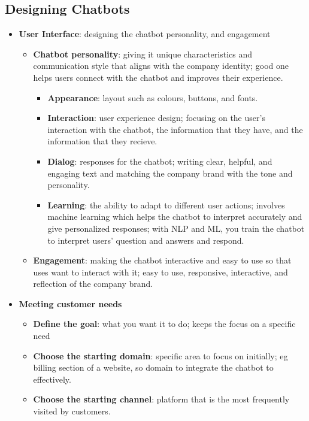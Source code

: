 \documentclass[12pt, letterpaper]{article}
\begin{document}
\subsection{Designing Chatbots}
\begin{itemize}
    \item \textbf{User Interface}: designing the chatbot personality, and engagement
        \begin{itemize}
            \item \textbf{Chatbot personality}: giving it unique characteristics and communication style that aligns with the company identity; good one helps users connect with the chatbot and improves their experience.
                \begin{itemize}
                    \item \textbf{Appearance}: layout such as colours, buttons, and fonts.
                    \item \textbf{Interaction}: user experience design; focusing on the user's interaction with the chatbot, the information that they have, and the information that they recieve.
                    \item \textbf{Dialog}: responses for the chatbot; writing clear, helpful, and engaging text and matching the company brand with the tone and personality.
                    \item \textbf{Learning}: the ability to adapt to different user actions; involves machine learning which helps the chatbot to interpret accurately and give personalized responses; with NLP and ML, you train the chatbot to interpret users' question and answers and respond.
                \end{itemize}
            \item \textbf{Engagement}: making the chatbot interactive and easy to use so that uses want to interact with it; easy to use, responsive, interactive, and reflection of the company brand.
        \end{itemize}
    \item \textbf{Meeting customer needs}
        \begin{itemize}
            \item \textbf{Define the goal}: what you want it to do; keeps the focus on a specific need 
            \item \textbf{Choose the starting domain}: specific area to focus on initially; eg billing section of a website, so domain to integrate the chatbot to effectively.
            \item \textbf{Choose the starting channel}: platform that is the most frequently visited by customers.

\end{itemize}
\end{itemize}
\end{document}
